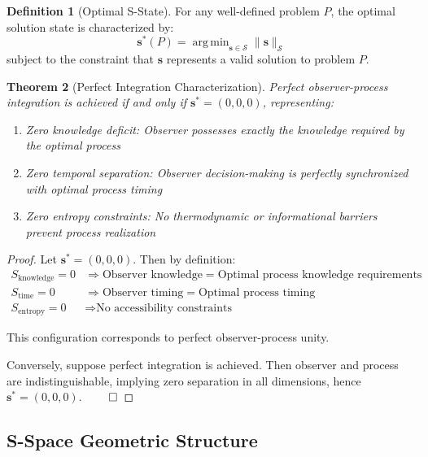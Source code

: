 \documentclass[11pt]{article}
\newtheorem{theorem}{Theorem}[section]
\theoremstyle{definition}
\newtheorem{definition}[theorem]{Definition}
\theoremstyle{remark}
\DeclareMathOperator{\argmin}{arg\,min}
\newcommand{\SEntropy}{\mathcal{S}}
\begin{document}
\begin{definition}[Optimal S-State]
For any well-defined problem $P$, the optimal solution state is characterized by:
\begin{equation}
\mathbf{s}^*(P) = \argmin_{\mathbf{s} \in \SEntropy} \|\mathbf{s}\|_{\SEntropy}
\end{equation}
subject to the constraint that $\mathbf{s}$ represents a valid solution to problem $P$.
\end{definition}

\begin{theorem}[Perfect Integration Characterization]
\label{thm:perfect_integration}
Perfect observer-process integration is achieved if and only if $\mathbf{s}^* = (0, 0, 0)$, representing:
\begin{enumerate}
\item Zero knowledge deficit: Observer possesses exactly the knowledge required by the optimal process
\item Zero temporal separation: Observer decision-making is perfectly synchronized with optimal process timing
\item Zero entropy constraints: No thermodynamic or informational barriers prevent process realization
\end{enumerate}
\end{theorem}

\begin{proof}
Let $\mathbf{s}^* = (0, 0, 0)$. Then by definition:
\begin{align}
S_{\text{knowledge}} = 0 &\Rightarrow \text{Observer knowledge} = \text{Optimal process knowledge requirements} \\
S_{\text{time}} = 0 &\Rightarrow \text{Observer timing} = \text{Optimal process timing} \\
S_{\text{entropy}} = 0 &\Rightarrow \text{No accessibility constraints}
\end{align}

This configuration corresponds to perfect observer-process unity.

Conversely, suppose perfect integration is achieved. Then observer and process are indistinguishable, implying zero separation in all dimensions, hence $\mathbf{s}^* = (0, 0, 0)$. $\qed$
\end{proof}

\subsection{S-Space Geometric Structure}
\end{document}
